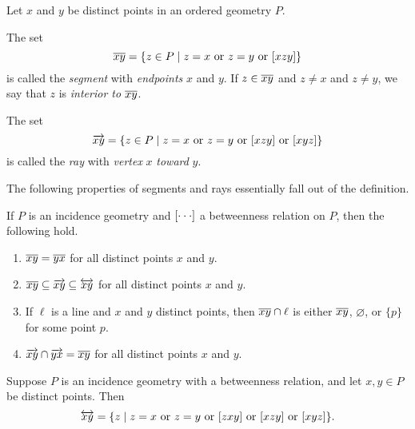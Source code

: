 \begin{dfn}
Let \(x\) and \(y\) be distinct points in an ordered geometry \(P\).
\begin{proplist}
\item The set \[ \overline{xy} = \{ z \in P \mid z = x\ \mathrm{or}\ z = y\ \mathrm{or}\ [ x z y ] \} \] is called the \emph{segment} with \emph{endpoints} \(x\) and \(y\).
If \(z \in \overline{xy}\) and \(z \neq x\) and \(z \neq y\), we say that \(z\) is \emph{interior to} \(\overline{xy}\).
\item The set \[ \RAY{x}{y} = \{ z \in P \mid z = x\ \mathrm{or}\ z = y\ \mathrm{or}\ \BETWEEN{x}{z}{y}\ \mathrm{or}\ \BETWEEN{x}{y}{z} \} \] is called the \emph{ray} with \emph{vertex} \(x\) \emph{toward} \(y\).
\end{proplist}
\end{dfn}

The following properties of segments and rays essentially fall out of the definition.

\begin{prop}
If \(P\) is an incidence geometry and \([ \cdot \cdot \cdot ]\) a betweenness relation on \(P\), then the following hold.
\begin{enumerate}
\item \(\overline{xy} = \overline{yx}\) for all distinct points \(x\) and \(y\).
\item \(\overline{xy} \subseteq \overrightarrow{xy} \subseteq \overleftrightarrow{xy}\) for all distinct points \(x\) and \(y\).
\item If \(\ell\) is a line and \(x\) and \(y\) distinct points, then \(\overline{xy} \cap \ell\) is either \(\overline{xy}\), \(\varnothing\), or \(\{p\}\) for some point \(p\).
\item \(\overrightarrow{xy} \cap \overrightarrow{yx} = \overline{xy}\) for all distinct points \(x\) and \(y\).
\end{enumerate}
\end{prop}



\begin{prop}\label{prop:line-decomp}
Suppose \(P\) is an incidence geometry with a betweenness relation, and let \(x,y \in P\) be distinct points.
Then \[ \LINE{x}{y} = \{ z \mid z = x\ \mathrm{or}\ z = y\ \mathrm{or}\ \BETWEEN{z}{x}{y}\ \mathrm{or}\ \BETWEEN{x}{z}{y}\ \mathrm{or}\ \BETWEEN{x}{y}{z} \}. \]
\end{prop}

